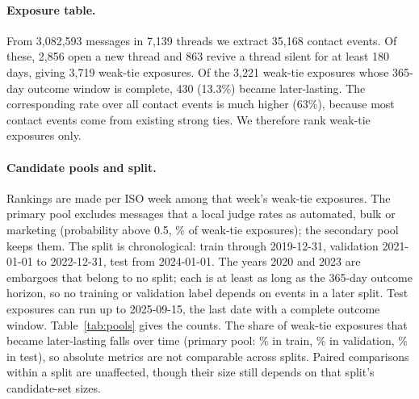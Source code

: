 \documentclass[11pt]{article}
\begin{document}
\begin{table}[t]
\centering
\small

\caption{Other long-running or dense records found in a survey of all of the subject's archives. None is used in this study. Spans are read from the records' own timestamps where they have them.}
\label{tab:other}
\end{table}

\begin{table}[t]
\centering
\small

\caption{Message sources, 2011-11 to 2026-09-15. Messages are normalized into one event schema with hashed thread identifiers. A contact event is a burst that starts with an inbound message.}
\label{tab:sources}
\end{table}

\paragraph{Exposure table.} From 3{,}082{,}593 messages in 7{,}139 threads we extract 35{,}168 contact events. Of these, 2{,}856 open a new thread and 863 revive a thread silent for at least 180 days, giving 3{,}719 weak-tie exposures. Of the 3{,}221 weak-tie exposures whose 365-day outcome window is complete, 430 (13.3\%) became later-lasting. The corresponding rate over all contact events is much higher (63\%), because most contact events come from existing strong ties. We therefore rank weak-tie exposures only.

\paragraph{Candidate pools and split.} Rankings are made per ISO week among that week's weak-tie exposures. The primary pool excludes messages that a local judge rates as automated, bulk or marketing (probability above 0.5, \gemmaAutoPct\% of weak-tie exposures); the secondary pool keeps them. The split is chronological: train through 2019-12-31, validation 2021-01-01 to 2022-12-31, test from 2024-01-01. The years 2020 and 2023 are embargoes that belong to no split; each is at least as long as the 365-day outcome horizon, so no training or validation label depends on events in a later split. Test exposures can run up to 2025-09-15, the last date with a complete outcome window. Table~\ref{tab:pools} gives the counts. The share of weak-tie exposures that became later-lasting falls over time (primary pool: \nPTrRate\% in train, \nPVaRate\% in validation, \nPTeRate\% in test), so absolute metrics are not comparable across splits. Paired comparisons within a split are unaffected, though their size still depends on that split's candidate-set sizes.
\end{document}
